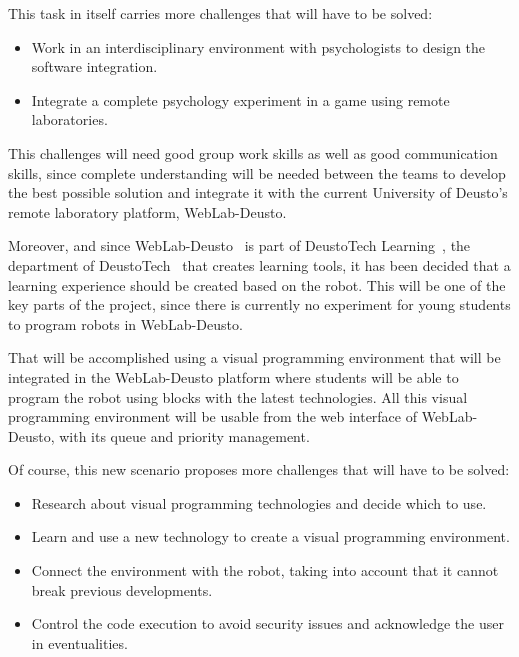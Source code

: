 This task in itself carries more challenges that will have to be solved:

\begin{itemize}

	\item Work in an interdisciplinary environment with psychologists to design the software
	integration.

	\item Integrate a complete psychology experiment in a game using remote laboratories.

\end{itemize}

This challenges will need good group work skills as well as good communication skills, since
complete understanding will be needed between the teams to develop the best possible solution and
integrate it with the current University of Deusto's remote laboratory platform, WebLab-Deusto.

Moreover, and since WebLab-Deusto~\cite{weblab_web} is part of DeustoTech
Learning~\cite{dtlearning_web}, the department of DeustoTech~\cite{deustotech_web} that creates
learning tools, it has been decided that a learning experience should be created based on the robot.
This will be one of the key parts of the project, since there is currently no experiment for young
students to program robots in WebLab-Deusto.

That will be accomplished using a visual programming environment that will be integrated in the
WebLab-Deusto platform where students will be able to program the robot using blocks with the latest
technologies. All this visual programming environment will be usable from the web interface of
WebLab-Deusto, with its queue and priority management.

Of course, this new scenario proposes more challenges that will have to be solved:

\begin{itemize}
	\item Research about visual programming technologies and decide which to use.

	\item Learn and use a new technology to create a visual programming environment.

	\item Connect the environment with the robot, taking into account that it cannot break previous
	developments.

	\item Control the code execution to avoid security issues and acknowledge the user in
	eventualities.
\end{itemize}

